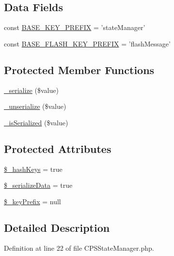 \subsection*{Data Fields}
\begin{DoxyCompactItemize}
\item 
const \hyperlink{classCPSStateManager_a0ab4998637c35aaf21bf01bb642b6e41}{BASE\_\-KEY\_\-PREFIX} = 'stateManager'
\item 
const \hyperlink{classCPSStateManager_a4f2dfe143b9da4d0998257b61eecc8be}{BASE\_\-FLASH\_\-KEY\_\-PREFIX} = 'flashMessage'
\end{DoxyCompactItemize}
\subsection*{Protected Member Functions}
\begin{DoxyCompactItemize}
\item 
\hyperlink{classCPSStateManager_aef8105c18b26b9694968813aef02bfff}{\_\-serialize} (\$value)
\item 
\hyperlink{classCPSStateManager_a24cf27ade8d80afda9be4de310351aad}{\_\-unserialize} (\$value)
\item 
\hyperlink{classCPSStateManager_a7a8991bc35b616d7efbfbf6f23ff83c9}{\_\-isSerialized} (\$value)
\end{DoxyCompactItemize}
\subsection*{Protected Attributes}
\begin{DoxyCompactItemize}
\item 
\hyperlink{classCPSStateManager_ad57dba8c7d1cafb4ca1798f7c981cda8}{\$\_\-hashKeys} = true
\item 
\hyperlink{classCPSStateManager_a4ab3ef1abf22d7966e653c2f981eccbc}{\$\_\-serializeData} = true
\item 
\hyperlink{classCPSStateManager_a1f1b11d239bcb8bdfe83626a972050a6}{\$\_\-keyPrefix} = null
\end{DoxyCompactItemize}


\subsection{Detailed Description}


Definition at line 22 of file CPSStateManager.php.



